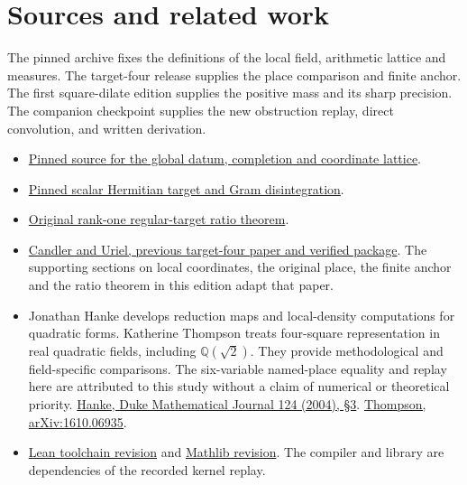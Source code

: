 \documentclass[12pt,letterpaper]{article}
\begin{document}
\section*{Sources and related work}
The pinned archive fixes the definitions of the local field, arithmetic lattice and measures. The target-four release supplies the place comparison and finite anchor. The first square-dilate edition supplies the positive mass and its sharp precision. The companion checkpoint supplies the new obstruction replay, direct convolution, and written derivation.
\begin{itemize}
\item \href{https://github.com/nousentllc/riemann-hypothesis/blob/40e56bab026552e089d7afcfeff08d2defb9c005/src/Formalism/SharpRestriction/GlobalSchurBounds/GeneralLinearActions/GenusMassVolumes.lean}{Pinned source for the global datum, completion and coordinate lattice}.
\item \href{https://github.com/nousentllc/riemann-hypothesis/blob/40e56bab026552e089d7afcfeff08d2defb9c005/src/CompanionTheory/SpectralGeometry/CountingDefinitions/AdelicEulerProducts/IsEulerProd.lean}{Pinned scalar Hermitian target and Gram disintegration}.
\item \href{https://github.com/nousentllc/riemann-hypothesis/blob/40e56bab026552e089d7afcfeff08d2defb9c005/src/CompanionTheory/SpectralGeometry/LocalGlobalProofs/AdelicAnalysis/LocalGramFiberRankOneSetFormula.lean#L310}{Original rank-one regular-target ratio theorem}.
\item \href{https://github.com/nousentllc/riemann-hypothesis/tree/63c06fe44eb700e4550e4a2b70adafe09cb1ff9b/research/uriel/experiments/ramified-gram-bridge}{Candler and Uriel, previous target-four paper and verified package}. The supporting sections on local coordinates, the original place, the finite anchor and the ratio theorem in this edition adapt that paper.
\item Jonathan Hanke develops reduction maps and local-density computations for quadratic forms. Katherine Thompson treats four-square representation in real quadratic fields, including $\mathbb Q(\sqrt2)$. They provide methodological and field-specific comparisons. The six-variable named-place equality and replay here are attributed to this study without a claim of numerical or theoretical priority. \href{https://www.jonhanke.com/Hanke--all_papers__as_of_2015-01-14/explicit-bounds-paper.pdf}{Hanke, Duke Mathematical Journal 124 (2004), §3}. \href{https://arxiv.org/abs/1610.06935}{Thompson, arXiv:1610.06935}.
\item \href{https://github.com/leanprover/lean4/commit/819816b2e0a3bf405af45ae5c7af2491d8f5bee6}{Lean toolchain revision} and \href{https://github.com/leanprover-community/mathlib4/commit/0df444a360eaa60ab8c11dca51a86af692955474}{Mathlib revision}. The compiler and library are dependencies of the recorded kernel replay.

\end{itemize}
\end{document}
